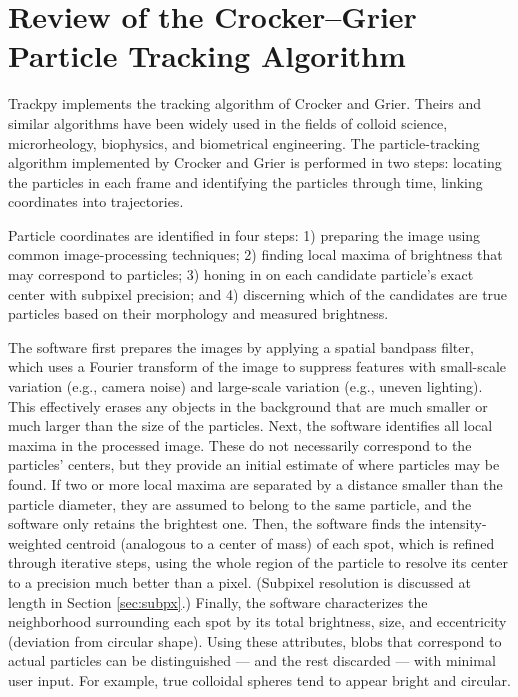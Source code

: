 \section{Review of the Crocker--Grier Particle Tracking Algorithm}

Trackpy implements the tracking algorithm of Crocker and Grier\cite{Crocker1996}. Theirs and similar algorithms\cite{Ghosh1994} have been widely used in the fields of colloid science, microrheology, biophysics, and biometrical engineering. The particle-tracking algorithm implemented by Crocker and Grier is performed in two steps: locating the particles in each frame and identifying the particles through time, linking coordinates into trajectories.

Particle coordinates are identified in four steps: 1) preparing the image using common image-processing techniques; 2) finding local maxima of brightness that may correspond to particles; 3) honing in on each candidate particle's exact center with subpixel precision; and 4) discerning which of the candidates are true particles based on their morphology and measured brightness.

The software first prepares the images by applying a spatial bandpass filter, which uses a Fourier transform of the image to suppress features with small-scale variation (e.g., camera noise) and large-scale variation (e.g., uneven lighting). This effectively erases any objects in the background that are much smaller or much larger than the size of the particles. Next, the software identifies all local maxima in the processed image. These do not necessarily correspond to the particles' centers, but they provide an initial estimate of where particles may be found. If two or more local maxima are separated by a distance smaller than the particle diameter, they are assumed to belong to the same particle, and the software only retains the brightest one. Then, the software finds the intensity-weighted centroid (analogous to a center of mass) of each spot, which is refined through iterative steps, using the whole region of the particle to resolve its center to a precision much better than a pixel. (Subpixel resolution is discussed at length in Section \ref{sec:subpx}.) Finally, the software characterizes the neighborhood surrounding each spot by its total brightness, size, and eccentricity (deviation from circular shape). Using these attributes, blobs that correspond to actual particles can be distinguished --- and the rest discarded --- with minimal user input. For example, true colloidal spheres tend to appear bright and circular.

